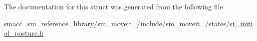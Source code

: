 The documentation for this struct was generated from the following file\+:\begin{DoxyCompactItemize}
\item 
smacc\+\_\+sm\+\_\+reference\+\_\+library/sm\+\_\+moveit\+\_/include/sm\+\_\+moveit\+\_/states/\hyperlink{2_2include_2sm__moveit__2_2states_2st__initial__posture_8h}{st\+\_\+initial\+\_\+posture.\+h}\end{DoxyCompactItemize}
